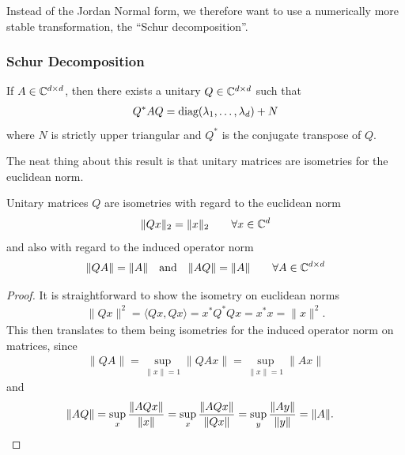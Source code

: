 Instead of the Jordan Normal form, we therefore want to use a numerically more
stable transformation, the ``Schur decomposition''.

\subsubsection{Schur Decomposition}

\begin{theorem}
	If \(A\in\mathbb{C}^{d\times d}\), then there exists a unitary
	\(Q\in\mathbb{C}^{d\times d}\) such that
	\begin{align*}
		Q^* A Q = \text{diag}(\lambda_1, \dots, \lambda_d) + N
	\end{align*}
	where \(N\) is strictly upper triangular and \(Q^*\) is the conjugate
	transpose of \(Q\).
\end{theorem}

The neat thing about this result is that unitary matrices are isometries for the
euclidean norm.

\begin{lemma}
	\label{lem: unitary matrices are isometries}
	Unitary matrices \(Q\) are isometries with regard to the euclidean norm
	\begin{align*}
		\|Qx\|_2 = \|x\|_2 \qquad \forall x\in\mathbb{C}^d
	\end{align*}	
	and also with regard to the induced operator norm
	\begin{align*}
		\|QA\| = \|A\| \quad \text{and} \quad \|AQ\| = \|A\|
		\qquad \forall A \in\mathbb{C}^{d\times d}
	\end{align*}
\end{lemma}
\begin{proof}
	It is straightforward to show the isometry on euclidean norms
	\begin{align*}
		\|Qx\|^2 = \langle Qx, Qx\rangle = x^* Q^* Q x = x^* x = \|x\|^2.
	\end{align*}
	This then translates to them being isometries for the induced operator norm
	on matrices, since
	\begin{align*}
		\|QA\| = \sup_{\|x\|=1} \|QAx\| = \sup_{\|x\|=1} \|Ax\|
	\end{align*}
	and
	\begin{align*}
		\|AQ\|
		&= \sup_{x} \frac{\|AQx\|}{\|x\|} = \sup_{x} \frac{\|AQx\|}{\|Qx\|}
		= \sup_{y} \frac{\|Ay\|}{\|y\|} = \|A\|.
		\qedhere
	\end{align*}
\end{proof}

